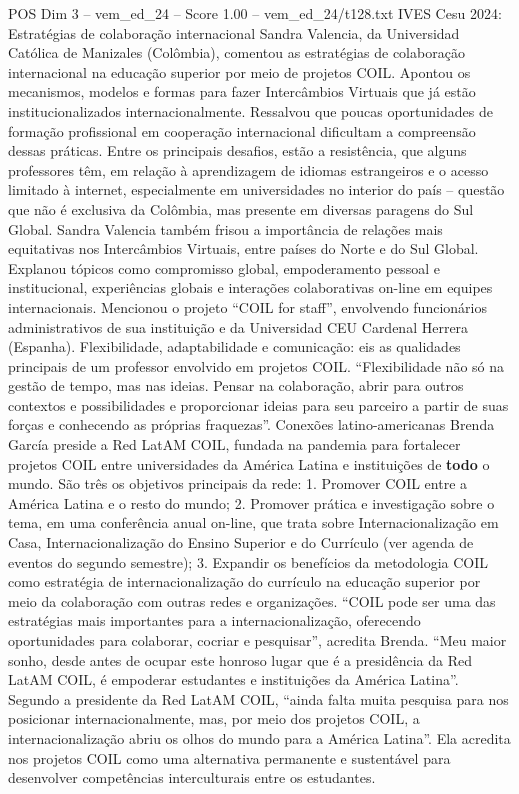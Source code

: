 \begin{textsample}{POS Dim 3 – vem\_ed\_24 – Score 1.00 – vem\_ed\_24/t128.txt}  \label{ex:f3_pos_077}
IVES Cesu 2024: Estratégias de colaboração internacional Sandra Valencia, da Universidad Católica de Manizales (Colômbia), comentou as estratégias de colaboração internacional na educação superior por meio de projetos COIL.
Apontou os mecanismos, modelos e formas para fazer Intercâmbios Virtuais que já estão institucionalizados internacionalmente.
Ressalvou que poucas oportunidades de formação profissional em cooperação internacional dificultam a compreensão dessas práticas.
Entre os principais desafios, estão a resistência, que alguns professores têm, em relação à aprendizagem de idiomas estrangeiros e o acesso limitado à internet, especialmente em universidades no interior do país – questão que não é exclusiva da Colômbia, mas presente em diversas paragens do Sul Global.
Sandra Valencia também frisou a importância de relações mais equitativas nos Intercâmbios Virtuais, entre países do Norte e do Sul Global.
Explanou tópicos como compromisso global, empoderamento pessoal e institucional, experiências globais e interações colaborativas on-line em equipes internacionais.
Mencionou o projeto “COIL for staff”, envolvendo funcionários administrativos de sua instituição e da Universidad CEU Cardenal Herrera (Espanha).
Flexibilidade, adaptabilidade e comunicação: eis as qualidades principais de um professor envolvido em projetos COIL. “Flexibilidade não só na gestão de tempo, mas nas ideias.
Pensar na colaboração, abrir para outros contextos e possibilidades e proporcionar ideias para seu parceiro a partir de suas forças e conhecendo as próprias fraquezas”.
Conexões latino-americanas Brenda García preside a Red LatAM COIL, fundada na pandemia para fortalecer projetos COIL entre universidades da América Latina e instituições de \textbf{todo} o mundo.
São três os objetivos principais da rede: 1.
Promover COIL entre a América Latina e o resto do mundo; 2.
Promover prática e investigação sobre o tema, em uma conferência anual on-line, que trata sobre Internacionalização em Casa, Internacionalização do Ensino Superior e do Currículo (ver agenda de eventos do segundo semestre); 3.
Expandir os benefícios da metodologia COIL como estratégia de internacionalização do currículo na educação superior por meio da colaboração com outras redes e organizações. “COIL pode ser uma das estratégias mais importantes para a internacionalização, oferecendo oportunidades para colaborar, cocriar e pesquisar”, acredita Brenda. “Meu maior sonho, desde antes de ocupar este honroso lugar que é a presidência da Red LatAM COIL, é empoderar estudantes e instituições da América Latina”.
Segundo a presidente da Red LatAM COIL, “ainda falta muita pesquisa para nos posicionar internacionalmente, mas, por meio dos projetos COIL, a internacionalização abriu os olhos do mundo para a América Latina”.
Ela acredita nos projetos COIL como uma alternativa permanente e sustentável para desenvolver competências interculturais entre os estudantes.

\end{textsample}
